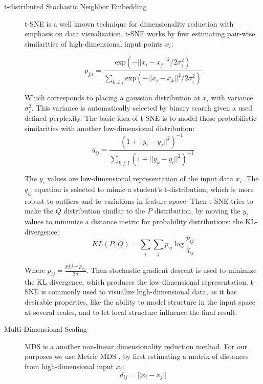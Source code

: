 \begin{description}
	\item[t-distributed Stochastic Neighbor Embedding] t-SNE \cite{maaten2008visualizing} is a well known technique for dimensionality reduction with emphasis on data visualization. t-SNE works by first estimating pair-wise similarities of high-dimensional input points $x_i$:
    
	\begin{equation}
		p_{j|i} = \frac{\text{exp}(-||x_i - x_j||^2 / 2\sigma_i^2)}{\sum _{k \neq i}\text{exp}(-||x_i - x_k||^2 / 2\sigma_i^2)}
	\end{equation}
	
	Which corresponds to placing a gaussian distribution at $x_i$ with variance $\sigma_i^2$. This variance is automatically selected by binary search given a used defined perplexity. The basic idea of t-SNE is to model these probabilistic similarities with another low-dimensional distribution:
	\vspace*{1em}
	\begin{equation}
		q_{ij} = \frac{(1 + ||y_i - y_j||^2)^{-1}}{\sum_{k \neq l} (1 + ||y_k - y_l||^2)^{-1} }
	\end{equation}
	
	The $y_i$ values are low-dimensional representation of the input data $x_i$. The $q_{ij}$ equation is selected to mimic a student's t-distribution, which is more robust to outliers and to variations in feature space. Then t-SNE tries to make the $Q$ distribution similar to the $P$ distribution, by moving the $y_i$ values to minimize a distance metric for probability distributions: the KL-divergence:
	\vspace*{1em}
	\begin{equation}
		KL(P||Q) = \sum_i \sum_j p_{ij} \log \frac{p_{ij}}{q_{ij}}
	\end{equation}
	
	Where $p_{ij} = \frac{p{j|i} + p_{i|j}}{2n}$. Then stochastic gradient descent is used to minimize the KL divergence, which produces the low-dimensional representation.
	t-SNE is commonly used to visualize high-dimensional data, as it has desirable properties, like the ability to model structure in the input space at several scales, and to let local structure influence the final result.
	
	\item[Multi-Dimensional Scaling] MDS is a another non-linear dimensionality reduction method. For our purposes we use Metric MDS \cite{de2011multidimensional}, by first estimating a matrix of distances from high-dimensional input $x_i$:
	\vspace*{1em}
	\begin{equation}
		d_{ij} = ||x_i - x_j||
	\end{equation}
	

\end{description}
